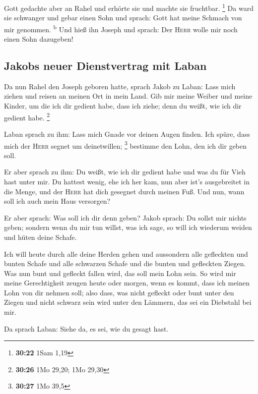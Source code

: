  Gott gedachte aber an Rahel und erhörte sie und machte
sie fruchtbar. \footnote{\textbf{30:22} 1Sam 1,19}  Da
ward sie schwanger und gebar einen Sohn und sprach: Gott hat meine
Schmach von mir genommen. \textsuperscript{b}  Und hieß
ihn Joseph und sprach: Der \textsc{Herr} wolle mir noch einen Sohn
dazugeben!

\hypertarget{jakobs-neuer-dienstvertrag-mit-laban}{%
\subsection{Jakobs neuer Dienstvertrag mit
Laban}\label{jakobs-neuer-dienstvertrag-mit-laban}}

 Da nun Rahel den Joseph geboren hatte, sprach Jakob zu
Laban: Lass mich ziehen und reisen an meinen Ort in mein Land.
 Gib mir meine Weiber und meine Kinder, um die ich dir
gedient habe, dass ich ziehe; denn du weißt, wie ich dir gedient habe.
\footnote{\textbf{30:26} 1Mo 29,20; 1Mo 29,30}

 Laban sprach zu ihm: Lass mich Gnade vor deinen Augen
finden. Ich spüre, dass mich der \textsc{Herr} segnet um deinetwillen;
\footnote{\textbf{30:27} 1Mo 39,5}  bestimme den Lohn,
den ich dir geben soll.

 Er aber sprach zu ihm: Du weißt, wie ich dir gedient
habe und was du für Vieh hast unter mir.  Du hattest
wenig, ehe ich her kam, nun aber ist's ausgebreitet in die Menge, und
der \textsc{Herr} hat dich gesegnet durch meinen Fuß. Und nun, wann soll
ich auch mein Haus versorgen?

 Er aber sprach: Was soll ich dir denn geben? Jakob
sprach: Du sollst mir nichts geben; sondern wenn du mir tun willst, was
ich sage, so will ich wiederum weiden und hüten deine Schafe.

 Ich will heute durch alle deine Herden gehen und
aussondern alle gefleckten und bunten Schafe und alle schwarzen Schafe
und die bunten und gefleckten Ziegen. Was nun bunt und gefleckt fallen
wird, das soll mein Lohn sein.  So wird mir meine
Gerechtigkeit zeugen heute oder morgen, wenn es kommt, dass ich meinen
Lohn von dir nehmen soll; also dass, was nicht gefleckt oder bunt unter
den Ziegen und nicht schwarz sein wird unter den Lämmern, das sei ein
Diebstahl bei mir.

 Da sprach Laban: Siehe da, es sei, wie du gesagt hast.


